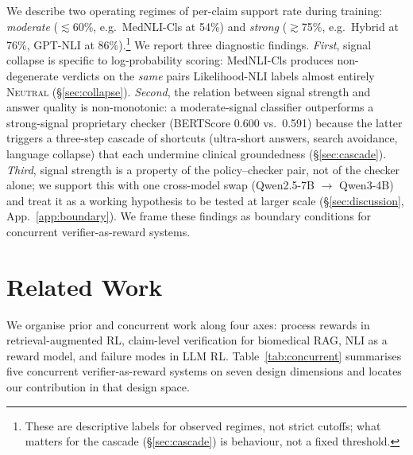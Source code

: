 \documentclass[11pt]{article}
\begin{document}
We describe two operating regimes of per-claim 
support rate during training: \emph{moderate} 
($\lesssim$60\%, e.g.\ MedNLI-Cls at 54\%) and 
\emph{strong} ($\gtrsim$75\%, e.g.\ Hybrid at 76\%, 
GPT-NLI at 86\%).\footnote{These are descriptive 
labels for observed regimes, not strict cutoffs; 
what matters for the cascade (\S\ref{sec:cascade}) 
is behaviour, not a fixed threshold.} We report 
three diagnostic findings.
\emph{First}, signal collapse is specific to log-probability scoring: 
MedNLI-Cls produces non-degenerate verdicts on the \emph{same} pairs 
Likelihood-NLI labels almost entirely \textsc{Neutral} 
(\S\ref{sec:collapse}).
\emph{Second}, the relation between signal strength and answer quality 
is non-monotonic: a moderate-signal classifier outperforms a 
strong-signal proprietary checker (BERTScore 0.600 vs.\ 0.591) 
because the latter triggers a three-step cascade of shortcuts 
(ultra-short answers, search avoidance, language collapse) that each 
undermine clinical groundedness (\S\ref{sec:cascade}).
\emph{Third}, signal strength is a property of the 
policy--checker pair, not of the checker alone; we 
support this with one cross-model swap (Qwen2.5-7B 
$\to$ Qwen3-4B) and treat it as a working hypothesis 
to be tested at larger scale 
(\S\ref{sec:discussion}, App.~\ref{app:boundary}).
We frame these findings as boundary conditions for 
concurrent verifier-as-reward systems.




\section{Related Work}
\label{sec:related}

We organise prior and concurrent work along four
axes: process rewards in retrieval-augmented RL,
claim-level verification for biomedical RAG, NLI as a
reward model, and failure modes in LLM RL.
Table~\ref{tab:concurrent} summarises five concurrent
verifier-as-reward systems on seven design dimensions
and locates our contribution in that design space.
\end{document}
